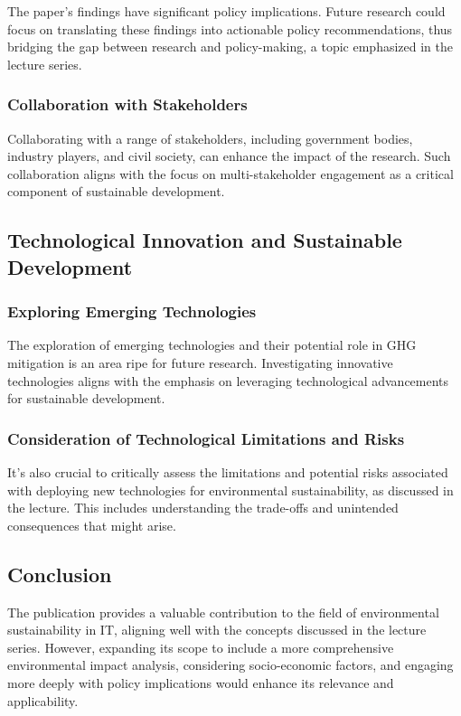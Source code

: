 \documentclass[conference,compsoc]{IEEEtran}
\begin{document}
The paper's findings have significant policy implications. Future research could focus on translating these findings into actionable policy recommendations, thus bridging the gap between research and policy-making, a topic emphasized in the lecture series.

\subsubsection{Collaboration with Stakeholders}

Collaborating with a range of stakeholders, including government bodies, industry players, and civil society, can enhance the impact of the research. Such collaboration aligns with the  focus on multi-stakeholder engagement as a critical component of sustainable development.

\subsection{Technological Innovation and Sustainable Development}

\subsubsection{Exploring Emerging Technologies}

The exploration of emerging technologies and their potential role in GHG mitigation is an area ripe for future research. Investigating innovative technologies aligns with the  emphasis on leveraging technological advancements for sustainable development.

\subsubsection{Consideration of Technological Limitations and Risks}

It's also crucial to critically assess the limitations and potential risks associated with deploying new technologies for environmental sustainability, as discussed in the lecture. This includes understanding the trade-offs and unintended consequences that might arise.

\subsection{Conclusion}

The publication provides a valuable contribution to the field of environmental sustainability in IT, aligning well with the concepts discussed in the lecture series. However, expanding its scope to include a more comprehensive environmental impact analysis, considering socio-economic factors, and engaging more deeply with policy implications would enhance its relevance and applicability.
\end{document}
